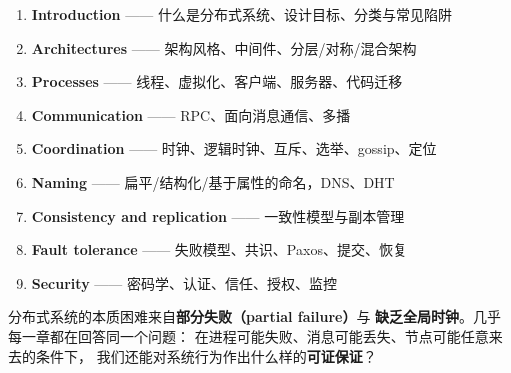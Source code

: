 \begin{enumerate}[leftmargin=1.6em]
  \item \textbf{Introduction} —— 什么是分布式系统、设计目标、分类与常见陷阱
  \item \textbf{Architectures} —— 架构风格、中间件、分层/对称/混合架构
  \item \textbf{Processes} —— 线程、虚拟化、客户端、服务器、代码迁移
  \item \textbf{Communication} —— RPC、面向消息通信、多播
  \item \textbf{Coordination} —— 时钟、逻辑时钟、互斥、选举、gossip、定位
  \item \textbf{Naming} —— 扁平/结构化/基于属性的命名，DNS、DHT
  \item \textbf{Consistency and replication} —— 一致性模型与副本管理
  \item \textbf{Fault tolerance} —— 失败模型、共识、Paxos、提交、恢复
  \item \textbf{Security} —— 密码学、认证、信任、授权、监控
\end{enumerate}

\begin{ideabox}[贯穿全书的一条主线]
分布式系统的本质困难来自\textbf{部分失败（partial failure）}与
\textbf{缺乏全局时钟}。几乎每一章都在回答同一个问题：
在进程可能失败、消息可能丢失、节点可能任意来去的条件下，
我们还能对系统行为作出什么样的\textbf{可证保证}？
\end{ideabox}
